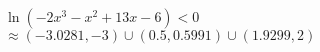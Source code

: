 {$\ln(-2x^{3} - x^{2} + 13x - 6) < 0$}
{$\approx (-3.0281, -3) \cup (0.5, 0.5991) \cup (1.9299, 2)$}